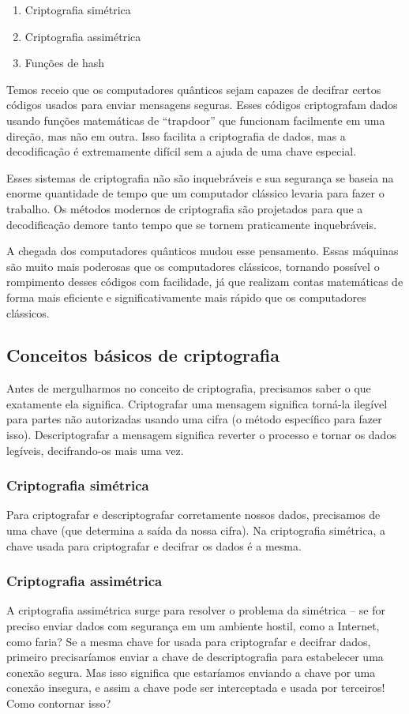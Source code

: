 \begin{enumerate}
  \item Criptografia simétrica
  \item Criptografia assimétrica
  \item Funções de hash
\end{enumerate}

Temos receio que os computadores quânticos sejam capazes de decifrar certos códigos usados para enviar mensagens seguras. Esses códigos criptografam dados usando funções matemáticas de ``trapdoor'' que funcionam facilmente em uma direção, mas não em outra. Isso facilita a criptografia de dados, mas a decodificação é extremamente difícil sem a ajuda de uma chave especial.

Esses sistemas de criptografia não são inquebráveis e sua segurança se baseia na enorme quantidade de tempo que um computador clássico levaria para fazer o trabalho. Os métodos modernos de criptografia são projetados para que a decodificação demore tanto tempo que se tornem praticamente inquebráveis.

A chegada dos computadores quânticos mudou esse pensamento. Essas máquinas são muito mais poderosas que os computadores clássicos, tornando possível o rompimento desses códigos com facilidade, já que realizam contas matemáticas de forma mais eficiente e significativamente mais rápido que os computadores clássicos.

\subsection{Conceitos básicos de criptografia}
Antes de mergulharmos no conceito de criptografia, precisamos saber o que exatamente ela significa. Criptografar uma mensagem significa torná-la ilegível para partes não autorizadas usando uma cifra (o método específico para fazer isso). Descriptografar a mensagem significa reverter o processo e tornar os dados legíveis, decifrando-os mais uma vez.

\subsubsection{Criptografia simétrica}
Para criptografar e descriptografar corretamente nossos dados, precisamos de uma chave (que determina a saída da nossa cifra). Na criptografia simétrica, a chave usada para criptografar e decifrar os dados é a mesma.

\subsubsection{Criptografia assimétrica}
A criptografia assimétrica surge para resolver o problema da simétrica – se for preciso enviar dados com segurança em um ambiente hostil, como a Internet, como faria? Se a mesma chave for usada para criptografar e decifrar dados, primeiro precisaríamos enviar a chave de descriptografia para estabelecer uma conexão segura. Mas isso significa que estaríamos enviando a chave por uma conexão insegura, e assim a chave pode ser interceptada e usada por terceiros! Como contornar isso?

